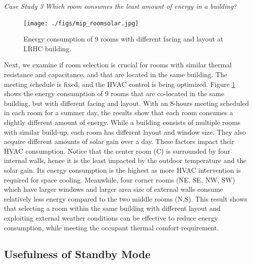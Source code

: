\vspace{10px}
\emph{Case Study 3} \quad \textsl{Which room consumes the least amount of energy in a building?}
\vspace{10px}

\begin{figure}
	\centering
		\texttt{[image: ./figs/mip\_roomsolar.jpg]}		
	\caption{Energy consumption of 9 rooms with different facing and layout at LRHC building.}
	\label{fig:mip_rs}
\end{figure}

Next, we examine if room selection is crucial for rooms with similar thermal resistance and capacitance, and that are located in the same building. The meeting schedule is fixed, and the HVAC control is being optimized. Figure \ref{fig:mip_rs} shows the energy consumption of 9 rooms that are co-located in the same building, but with different facing and layout. With an 8-hours meeting scheduled in each room for a summer day, the results show that each room consumes a slightly different amount of energy. While a building consists of multiple rooms with similar build-up, each room has different layout and window size. They also acquire different amounts of solar gain over a day. These factors impact their HVAC consumption. Notice that the center room (C) is surrounded by four internal walls, hence it is the least impacted by the outdoor temperature and the solar gain. Its energy consumption is the highest as more HVAC intervention is required for space cooling. Meanwhile, four corner rooms (NE, SE, NW, SW) which have larger windows and larger area size of external walls consume relatively less energy compared to the two middle rooms (N,S). This result shows that selecting a room within the same building with different layout and exploiting external weather conditions can be effective to reduce energy consumption, while meeting the occupant thermal comfort requirement.

\subsection{Usefulness of Standby Mode}
\label{subsec:experiments:standby}

